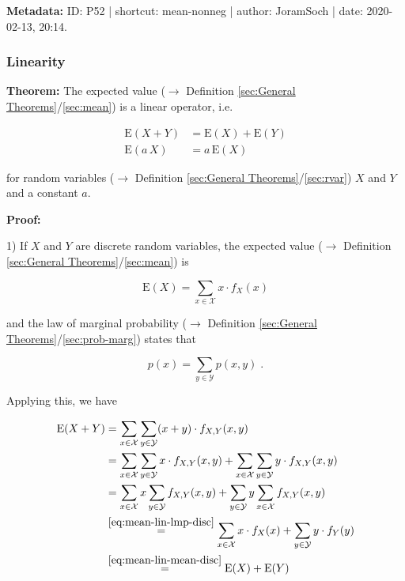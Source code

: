 \documentclass[a4paper,12pt,twoside]{book}
\begin{document}
\vspace{1em}
\textbf{Metadata:} ID: P52 | shortcut: mean-nonneg | author: JoramSoch | date: 2020-02-13, 20:14.
\vspace{1em}



\subsubsection[\textbf{Linearity}]{Linearity} \label{sec:mean-lin}
\setcounter{equation}{0}

\textbf{Theorem:} The expected value ($\rightarrow$ Definition \ref{sec:General Theorems}/\ref{sec:mean}) is a linear operator, i.e.

\begin{equation} \label{eq:mean-lin-mean-lin}
\begin{split}
\mathrm{E}(X + Y) &= \mathrm{E}(X) + \mathrm{E}(Y) \\
\mathrm{E}(a\,X) &= a\,\mathrm{E}(X)
\end{split}
\end{equation}

for random variables ($\rightarrow$ Definition \ref{sec:General Theorems}/\ref{sec:rvar}) $X$ and $Y$ and a constant $a$.


\vspace{1em}
\textbf{Proof:}

1) If $X$ and $Y$ are discrete random variables, the expected value ($\rightarrow$ Definition \ref{sec:General Theorems}/\ref{sec:mean}) is

\begin{equation} \label{eq:mean-lin-mean-disc}
\mathrm{E}(X) = \sum_{x \in \mathcal{X}} x \cdot f_X(x)
\end{equation}

and the law of marginal probability ($\rightarrow$ Definition \ref{sec:General Theorems}/\ref{sec:prob-marg}) states that

\begin{equation} \label{eq:mean-lin-lmp-disc}
p(x) = \sum_{y \in \mathcal{Y}} p(x,y) \; .
\end{equation}

Applying this, we have

\begin{equation} \label{eq:mean-lin-mean-lin-s1-disc}
\begin{split}
\mathrm{E}(X + Y) &= \sum_{x \in \mathcal{X}} \sum_{y \in \mathcal{Y}} (x+y) \cdot f_{X,Y}(x,y) \\
&= \sum_{x \in \mathcal{X}} \sum_{y \in \mathcal{Y}} x \cdot f_{X,Y}(x,y) + \sum_{x \in \mathcal{X}} \sum_{y \in \mathcal{Y}} y \cdot f_{X,Y}(x,y) \\
&= \sum_{x \in \mathcal{X}} x \sum_{y \in \mathcal{Y}} f_{X,Y}(x,y) + \sum_{y \in \mathcal{Y}} y \sum_{x \in \mathcal{X}} f_{X,Y}(x,y) \\
&\overset{\eqref{eq:mean-lin-lmp-disc}}{=} \sum_{x \in \mathcal{X}} x \cdot f_X(x) + \sum_{y \in \mathcal{Y}} y \cdot f_{Y}(y) \\
&\overset{\eqref{eq:mean-lin-mean-disc}}{=} \mathrm{E}(X) + \mathrm{E}(Y)
\end{split}
\end{equation}
\end{document}
